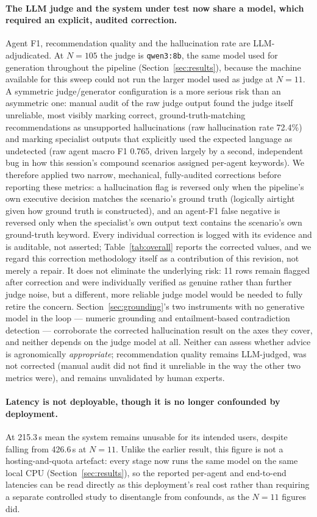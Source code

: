 \documentclass[preprint,12pt]{elsarticle}
\begin{document}
\paragraph{The LLM judge and the system under test now share a model,
which required an explicit, audited correction.} Agent F1,
recommendation quality and the hallucination rate are LLM-adjudicated.
At $N=105$ the judge is \texttt{qwen3:8b}, the same model used for
generation throughout the pipeline (Section~\ref{sec:results}), because
the machine available for this sweep could not run the larger model
used as judge at $N=11$. A symmetric judge/generator configuration is a
more serious risk than an asymmetric one: manual audit of the raw judge
output found the judge itself unreliable, most visibly marking correct,
ground-truth-matching recommendations as unsupported hallucinations
(raw hallucination rate 72.4\%) and marking specialist outputs that
explicitly used the expected language as undetected (raw agent macro F1
0.765, driven largely by a second, independent bug in how this
session's compound scenarios assigned per-agent keywords). We therefore
applied two narrow, mechanical, fully-audited corrections before
reporting these metrics: a hallucination flag is reversed only when the
pipeline's own executive decision matches the scenario's ground truth
(logically airtight given how ground truth is constructed), and an
agent-F1 false negative is reversed only when the specialist's own
output text contains the scenario's own ground-truth keyword. Every
individual correction is logged with its evidence and is auditable, not
asserted; Table~\ref{tab:overall} reports the corrected values, and we
regard this correction methodology itself as a contribution of this
revision, not merely a repair. It does not eliminate the underlying
risk: 11 rows remain flagged after correction and were individually
verified as genuine rather than further judge noise, but a different,
more reliable judge model would be needed to fully retire the concern.
Section~\ref{sec:grounding}'s two instruments with no generative model
in the loop --- numeric grounding and entailment-based contradiction
detection --- corroborate the corrected hallucination result on the axes
they cover, and neither depends on the judge model at all. Neither can
assess whether advice is agronomically \emph{appropriate}; recommendation
quality remains LLM-judged, was not corrected (manual audit did not find
it unreliable in the way the other two metrics were), and remains
unvalidated by human experts.

\paragraph{Latency is not deployable, though it is no longer confounded
by deployment.} At 215.3\,s mean the system remains unusable for its
intended users, despite falling from 426.6\,s at $N=11$. Unlike the
earlier result, this figure is not a hosting-and-quota artefact: every
stage now runs the same model on the same local CPU
(Section~\ref{sec:results}), so the reported per-agent and end-to-end
latencies can be read directly as this deployment's real cost rather
than requiring a separate controlled study to disentangle from
confounds, as the $N=11$ figures did.
\end{document}
